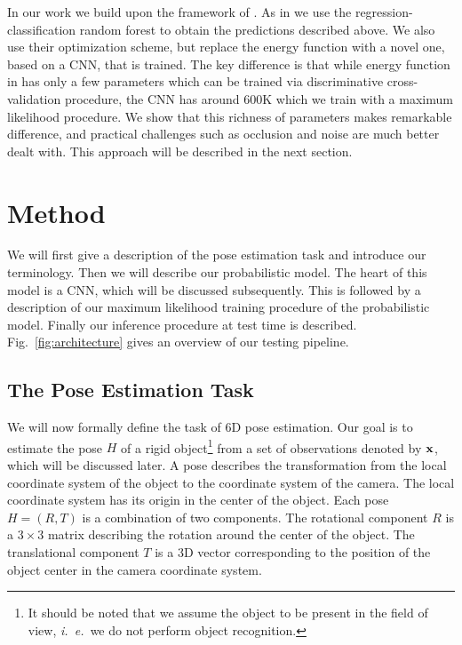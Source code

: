 \documentclass[10pt,letterpaper]{article}
\newcommand{\bx}{{\bf x}}
\newcommand{\ie}{\mbox{\emph{i. e.\ }}}
\begin{document}
In our work we build upon the framework of \cite{brachmann2014}. As in \cite{brachmann2014} we use the regression-classification random forest to obtain the predictions described above. We also use their optimization scheme, but replace the energy function with a novel one, based on a CNN, that is trained. The key difference is that while energy function in \cite{brachmann2014} has only a few parameters which can be trained via discriminative cross-validation procedure, the CNN has around 600K which we train with a maximum likelihood procedure. We show that this richness of parameters makes remarkable difference, and practical challenges such as occlusion and noise are much better dealt with. This approach will be described in the next section.

\section{Method}
\label{sec:methods}

We will first give a description of the pose estimation task and introduce our terminology. Then we will describe our probabilistic model. The heart of this model is a CNN, which will be discussed subsequently. This is followed by a description of our maximum likelihood training procedure of the probabilistic model. Finally our inference procedure at test time is described. Fig.~\ref{fig:architecture} gives an overview of our testing pipeline. 

\subsection{The Pose Estimation Task \label{sec:task}}

We will now formally define the task of 6D pose estimation. Our goal is to estimate the pose $H$ of a rigid object\footnote{It should be noted that we assume the object to be present in the field of view, \ie we do not perform object recognition.} from a set of observations denoted by $\bx$, which will be discussed later. A pose describes the transformation from the local coordinate system of the object to the coordinate system of the camera. The local coordinate system has its origin in the center of the object. Each pose $H=(R,T)$ is a combination of two components. The rotational component $R$ is a $3 \times 3$ matrix describing the rotation around the center of the object. The translational component $T$ is a 3D vector corresponding to the position of the object center in the camera coordinate system. 
\end{document}
